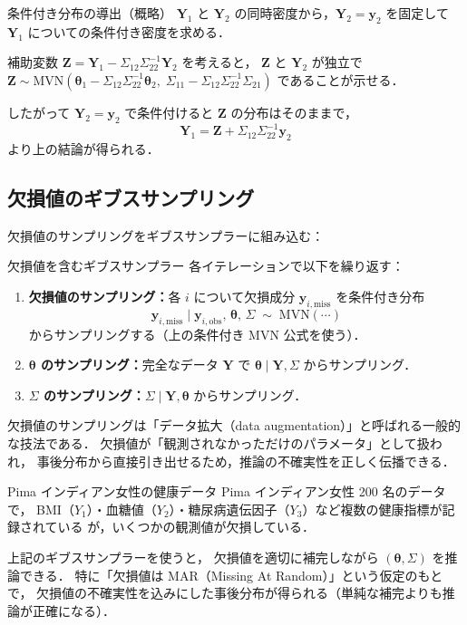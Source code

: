 \documentclass[lualatex,ja=standard,a4paper,12pt]{bxjsarticle}
\newcommand{\mvn}{\mathrm{MVN}}
\begin{document}
\begin{derivbox}{条件付き分布の導出（概略）}
$\bm{Y}_1$ と $\bm{Y}_2$ の同時密度から，$\bm{Y}_2 = \bm{y}_2$ を固定して $\bm{Y}_1$ についての条件付き密度を求める．

補助変数 $\bm{Z} = \bm{Y}_1 - \Sigma_{12}\Sigma_{22}^{-1}\bm{Y}_2$ を考えると，
$\bm{Z}$ と $\bm{Y}_2$ が独立で $\bm{Z} \sim \mvn(\bm{\theta}_1 - \Sigma_{12}\Sigma_{22}^{-1}\bm{\theta}_2,\; \Sigma_{11} - \Sigma_{12}\Sigma_{22}^{-1}\Sigma_{21})$ であることが示せる．

したがって $\bm{Y}_2 = \bm{y}_2$ で条件付けると $\bm{Z}$ の分布はそのままで，
\[
  \bm{Y}_1 = \bm{Z} + \Sigma_{12}\Sigma_{22}^{-1}\bm{y}_2
\]
より上の結論が得られる．
\end{derivbox}

\subsection{欠損値のギブスサンプリング}

欠損値のサンプリングをギブスサンプラーに組み込む：

\begin{algobox}{欠損値を含むギブスサンプラー}
各イテレーションで以下を繰り返す：
\begin{enumerate}
  \item \textbf{欠損値のサンプリング：}各 $i$ について欠損成分 $\bm{y}_{i,\text{miss}}$ を条件付き分布
        \[
          \bm{y}_{i,\text{miss}} \mid \bm{y}_{i,\text{obs}},\, \bm{\theta},\, \Sigma
          \;\sim\; \mvn(\cdots)
        \]
        からサンプリングする（上の条件付き MVN 公式を使う）．

  \item \textbf{$\bm{\theta}$ のサンプリング：}完全なデータ $\bm{Y}$ で $\bm{\theta} \mid \bm{Y}, \Sigma$ からサンプリング．

  \item \textbf{$\Sigma$ のサンプリング：}$\Sigma \mid \bm{Y}, \bm{\theta}$ からサンプリング．
\end{enumerate}
\end{algobox}

\begin{pointbox}
欠損値のサンプリングは「データ拡大（data augmentation）」と呼ばれる一般的な技法である．
欠損値が「観測されなかっただけのパラメータ」として扱われ，
事後分布から直接引き出せるため，推論の不確実性を正しく伝播できる．
\end{pointbox}

\begin{exbox}{Pima インディアン女性の健康データ}
Pima インディアン女性 200 名のデータで，
BMI（$Y_1$）・血糖値（$Y_2$）・糖尿病遺伝因子（$Y_3$）など複数の健康指標が記録されている
が，いくつかの観測値が欠損している．

\medskip
上記のギブスサンプラーを使うと，
欠損値を適切に補完しながら $(\bm{\theta}, \Sigma)$ を推論できる．
特に「欠損値は MAR（Missing At Random）」という仮定のもとで，
欠損値の不確実性を込みにした事後分布が得られる（単純な補完よりも推論が正確になる）．
\end{exbox}
\end{document}
